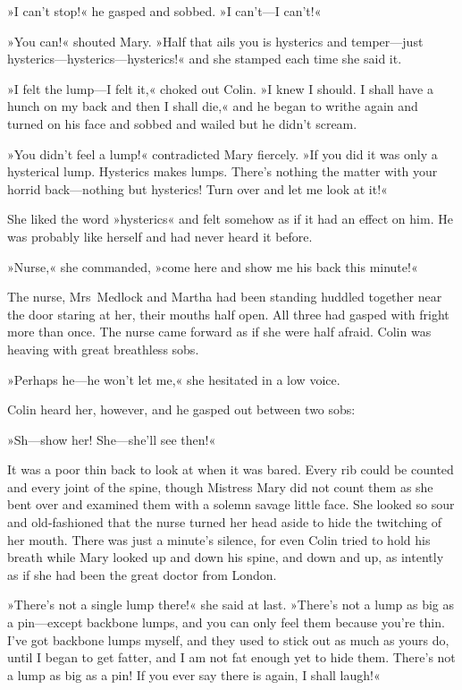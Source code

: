 »I can't stop!« he gasped and sobbed. »I can't—I can't!«

»You can!« shouted Mary. »Half that ails you is hysterics and temper—just hysterics—hysterics—hysterics!« and she stamped each time she said it.

»I felt the lump—I felt it,« choked out Colin. »I knew I should. I shall have a hunch on my back and then I shall die,« and he began to writhe again and turned on his face and sobbed and wailed but he didn't scream.

»You didn't feel a lump!« contradicted Mary fiercely. »If you did it was only a hysterical lump. Hysterics makes lumps. There's nothing the matter with your horrid back—nothing but hysterics! Turn over and let me look at it!«

She liked the word »hysterics« and felt somehow as if it had an effect on him. He was probably like herself and had never heard it before.

»Nurse,« she commanded, »come here and show me his back this minute!«

The nurse, Mrs~Medlock and Martha had been standing huddled together near the door staring at her, their mouths half open. All three had gasped with fright more than once. The nurse came forward as if she were half afraid. Colin was heaving with great breathless sobs.

»Perhaps he—he won't let me,« she hesitated in a low voice.

Colin heard her, however, and he gasped out between two sobs:

»Sh—show her! She—she'll see then!«

It was a poor thin back to look at when it was bared. Every rib could be counted and every joint of the spine, though Mistress Mary did not count them as she bent over and examined them with a solemn savage little face. She looked so sour and old-fashioned that the nurse turned her head aside to hide the twitching of her mouth. There was just a minute's silence, for even Colin tried to hold his breath while Mary looked up and down his spine, and down and up, as intently as if she had been the great doctor from London.

»There's not a single lump there!« she said at last. »There's not a lump as big as a pin—except backbone lumps, and you can only feel them because you're thin. I've got backbone lumps myself, and they used to stick out as much as yours do, until I began to get fatter, and I am not fat enough yet to hide them. There's not a lump as big as a pin! If you ever say there is again, I shall laugh!«

